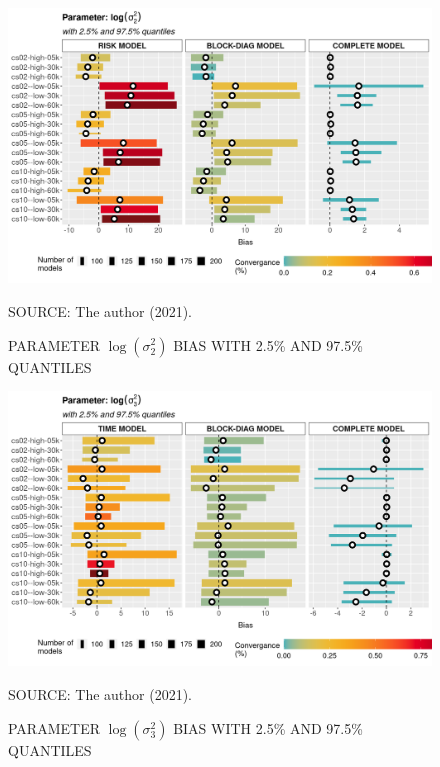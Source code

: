 \documentclass[12pt, %
               openright, %
               oneside, %
               a4paper, %
               chapter=TITLE, %
               section=TITLE, %
               brazil,
               english %
]{abntex2}
\begin{document}
\begin{apendicesenv}
\begin{figure}[H]
 \setlength{\abovecaptionskip}{.0001pt}
 \caption{PARAMETER \(\log(\sigma_{2}^{2})\) BIAS WITH 2.5\% AND 97.5\%
          QUANTILES}
 \vspace{0.2cm}\centering
 \includegraphics[width=\textwidth]{bias2plot-8.png}\\
 \begin{footnotesize}
  SOURCE: The author (2021).
 \end{footnotesize}
 \label{fig:biaslogs2_2}
\end{figure}

\begin{figure}[H]
 \setlength{\abovecaptionskip}{.0001pt}
 \caption{PARAMETER \(\log(\sigma_{3}^{2})\) BIAS WITH 2.5\% AND 97.5\%
          QUANTILES}
 \vspace{0.2cm}\centering
 \includegraphics[width=\textwidth]{bias2plot-9.png}\\
 \begin{footnotesize}
  SOURCE: The author (2021).
 \end{footnotesize}
 \label{fig:biaslogs2_3}
\end{figure}


\end{apendicesenv}
\end{document}
